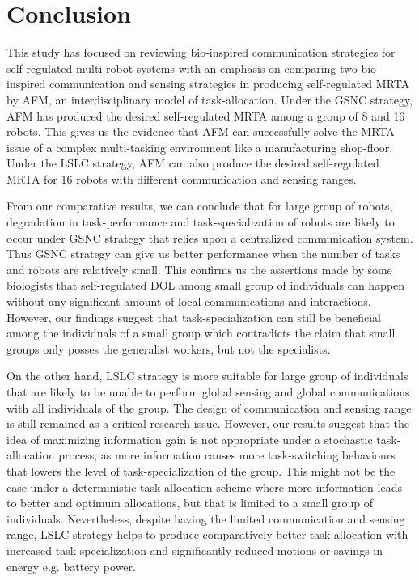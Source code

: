 \documentclass{intech}
\begin{document}
\section{Conclusion}
This study has focused on reviewing bio-inspired communication strategies for self-regulated multi-robot systems with an emphasis on comparing two bio-inspired  communication and sensing strategies in producing self-regulated MRTA by AFM, an interdisciplinary model of task-allocation. Under the GSNC strategy, AFM has produced the desired self-regulated MRTA among a group of 8 and 16 robots. This gives us the evidence that AFM can successfully solve the MRTA issue of a complex multi-tasking environment like a manufacturing shop-floor. Under the LSLC strategy, AFM can also produce the desired self-regulated MRTA for 16 robots with different communication and sensing ranges.

From our comparative results, we can conclude that for large group of robots,  degradation in  task-performance and task-specialization of robots are likely to occur  under GSNC strategy that relies upon a centralized communication system. Thus GSNC strategy can give us better performance when the number of tasks and robots are relatively small. This confirms us the assertions made by some biologists that self-regulated DOL among small group of individuals can happen without any significant amount of local communications and interactions. However, our findings suggest that task-specialization can still be beneficial among the individuals of a small group which contradicts the claim that small groups only posses the generalist workers, but not the specialists.

On the other hand, LSLC strategy is more suitable for large group of individuals that are likely to be unable to perform global sensing and global communications with all individuals of the group. The design of communication and sensing range is still remained as a critical research issue. However, our results suggest that the idea of maximizing information gain is not appropriate under a stochastic task-allocation process, as more information causes more task-switching behaviours that lowers the level of task-specialization of the group. This might not be the case under a deterministic task-allocation scheme where more information leads to better and optimum allocations, but that is limited to a small group of individuals. Nevertheless, despite having the limited communication and sensing range, LSLC strategy helps to produce comparatively better task-allocation with increased task-specialization and significantly reduced motions or savings in energy e.g. battery power. 
\end{document}
